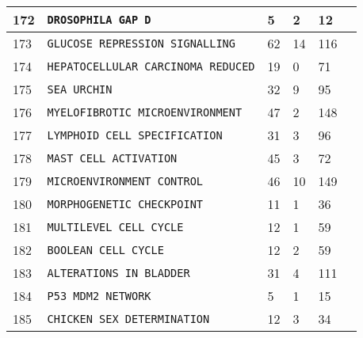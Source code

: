 \documentclass{article}
\begin{document}
\begin{center}
\begin{tabular}{ | C{16pt} | C{149pt} | C{25pt} | C{25pt} | C{25pt} | C{36pt} | }
	 	 & \texttt{DROSOPHILA GAP D} & 5 & 2 & 12 & \cite{bbm-169-170-171-172, ginsim} \\
	 	 & \texttt{GLUCOSE REPRESSION SIGNALLING} & 62 & 14 & 116 & \cite{bbm-173} \\
	 	 & \texttt{HEPATOCELLULAR CARCINOMA REDUCED} & 19 & 0 & 71 & \cite{bbm-092-174} \\
	 	 & \texttt{SEA URCHIN} & 32 & 9 & 95 & \cite{bbm-175, ginsim, biomodels} \\
	 	 & \texttt{MYELOFIBROTIC MICROENVIRONMENT} & 47 & 2 & 148 & \cite{bbm-176, ginsim} \\
	 	 & \texttt{LYMPHOID CELL SPECIFICATION} & 31 & 3 & 96 & \cite{bbm-073-177, ginsim} \\
	 	 & \texttt{MAST CELL ACTIVATION} & 45 & 3 & 72 & \cite{bbm-178, ginsim} \\
	 	 & \texttt{MICROENVIRONMENT CONTROL} & 46 & 10 & 149 & \cite{bbm-179, ginsim} \\
	 	 & \texttt{MORPHOGENETIC CHECKPOINT} & 11 & 1 & 36 & \cite{bbm-146-147-159-180, ginsim} \\
	 	 & \texttt{MULTILEVEL CELL CYCLE} & 12 & 1 & 59 & \cite{bbm-181-182, ginsim} \\
	 	 & \texttt{BOOLEAN CELL CYCLE} & 12 & 2 & 59 & \cite{bbm-181-182, ginsim} \\
	 	 & \texttt{ALTERATIONS IN BLADDER} & 31 & 4 & 111 & \cite{bbm-183, ginsim} \\
	 	 & \texttt{P53 MDM2 NETWORK} & 5 & 1 & 15 & \cite{bbm-184, ginsim} \\
	 	 & \texttt{CHICKEN SEX DETERMINATION} & 12 & 3 & 34 & \cite{bbm-185-186, ginsim} \\
	 	\hline	 	
	\end{tabular}


\end{center}
\end{document}
